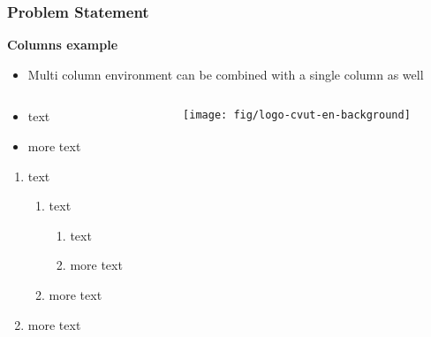 \begin{frame}
   \frametitle{Problem Statement}
   \textbf{\color{ctu4blue}Columns example}
   \begin{itemize}\justifying
      \item Multi column environment can be combined with a single column as well  
   \end{itemize}
   \begin{columns}[t, onlytextwidth]
      \begin{column}[T]{0.70\textwidth}
	 \begin{itemize}\justifying
	    \item text
	    \item more text
	 \end{itemize}
    \begin{enumerate}\justifying
      \item text
      \begin{enumerate}\justifying
         \item text
         \begin{enumerate}\justifying
            \item text
            \item more text
         \end{enumerate}
         \item more text
      \end{enumerate}
      \item more text
   \end{enumerate}
      \end{column}
      \begin{column}[T]{0.28\textwidth}
	 \texttt{[image: fig/logo-cvut-en-background]}
      \end{column}
   \end{columns}

\end{frame}

